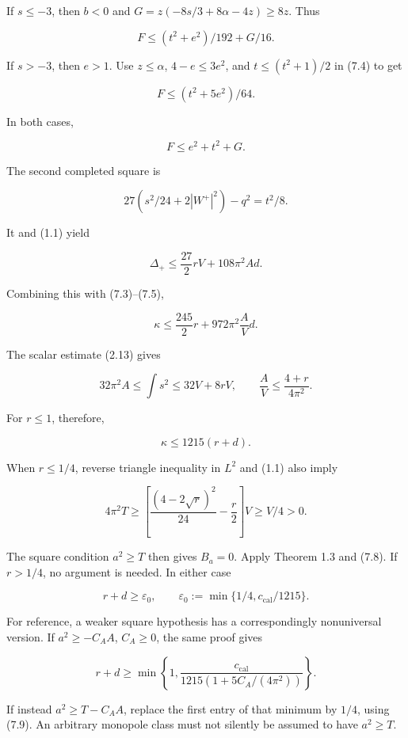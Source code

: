 \documentclass[
  10pt,
]{article}
\begin{document}
If \(s\le-3\), then \(b<0\) and \(G=z(-8s/3+8\alpha-4z)\ge8z\). Thus

\[
                       F\le(t^2+e^2)/192+G/16.
\]

If \(s>-3\), then \(e>1\). Use \(z\le\alpha\), \(4-e\le3e^2\), and
\(t\le(t^2+1)/2\) in (7.4) to get

\[
                       F\le(t^2+5e^2)/64.
\]

In both cases,

\[
                             F\le e^2+t^2+G.             \tag{7.5}
\]

The second completed square is

\[
 27\left(s^2/24+2|W^+|^2\right)-q^2=t^2/8.
\]

It and (1.1) yield

\[
 \Delta_+\le\frac{27}{2}rV+108\pi^2Ad.
\]

Combining this with (7.3)--(7.5),

\[
                     \kappa\le\frac{245}{2}r
                                      +972\pi^2\frac AVd.
 \tag{7.6}
\]

The scalar estimate (2.13) gives

\[
 32\pi^2A\le\int s^2\le32V+8rV,
              \qquad \frac AV\le\frac{4+r}{4\pi^2}.
 \tag{7.7}
\]

For \(r\le1\), therefore,

\[
                              \kappa\le1215(r+d).        \tag{7.8}
\]

When \(r\le1/4\), reverse triangle inequality in \(L^2\) and (1.1) also
imply

\[
 4\pi^2T
     \ge\left[\frac{(4-2\sqrt r)^2}{24}-\frac r2\right]V
     \ge V/4>0.                                          \tag{7.9}
\]

The square condition \(a^2\ge T\) then gives \(B_a=0\). Apply Theorem
1.3 and (7.8). If \(r>1/4\), no argument is needed. In either case

\[
       r+d\ge\varepsilon_0,
       \qquad \varepsilon_0:=\min\{1/4,c_{\mathrm{cal}}/1215\}.
 \tag{7.10}
\]

For reference, a weaker square hypothesis has a correspondingly
nonuniversal version. If \(a^2\ge-C_AA\), \(C_A\ge0\), the same proof
gives

\[
 r+d\ge\min\left\{1,
          \frac{c_{\mathrm{cal}}}{1215(1+5C_A/(4\pi^2))}\right\}.
 \tag{7.11}
\]

If instead \(a^2\ge T-C_AA\), replace the first entry of that minimum by
\(1/4\), using (7.9). An arbitrary monopole class must not silently be
assumed to have \(a^2\ge T\).
\end{document}
